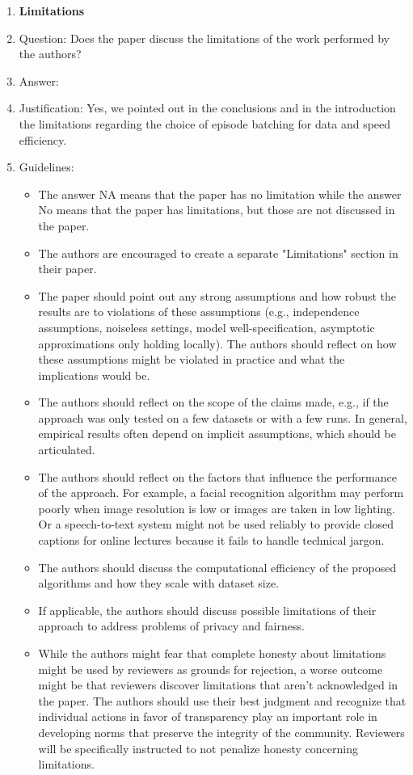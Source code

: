 \documentclass{article}
\begin{document}
\begin{enumerate}
\item {\bf Limitations}
    \item[] Question: Does the paper discuss the limitations of the work performed by the authors?
    \item[] Answer: \answerYes{} %
    \item[] Justification: Yes, we pointed out in the conclusions and in the introduction the limitations regarding the choice of episode batching for data and speed efficiency.
    \item[] Guidelines:
    \begin{itemize}
        \item The answer NA means that the paper has no limitation while the answer No means that the paper has limitations, but those are not discussed in the paper. 
        \item The authors are encouraged to create a separate "Limitations" section in their paper.
        \item The paper should point out any strong assumptions and how robust the results are to violations of these assumptions (e.g., independence assumptions, noiseless settings, model well-specification, asymptotic approximations only holding locally). The authors should reflect on how these assumptions might be violated in practice and what the implications would be.
        \item The authors should reflect on the scope of the claims made, e.g., if the approach was only tested on a few datasets or with a few runs. In general, empirical results often depend on implicit assumptions, which should be articulated.
        \item The authors should reflect on the factors that influence the performance of the approach. For example, a facial recognition algorithm may perform poorly when image resolution is low or images are taken in low lighting. Or a speech-to-text system might not be used reliably to provide closed captions for online lectures because it fails to handle technical jargon.
        \item The authors should discuss the computational efficiency of the proposed algorithms and how they scale with dataset size.
        \item If applicable, the authors should discuss possible limitations of their approach to address problems of privacy and fairness.
        \item While the authors might fear that complete honesty about limitations might be used by reviewers as grounds for rejection, a worse outcome might be that reviewers discover limitations that aren't acknowledged in the paper. The authors should use their best judgment and recognize that individual actions in favor of transparency play an important role in developing norms that preserve the integrity of the community. Reviewers will be specifically instructed to not penalize honesty concerning limitations.
    \end{itemize}


\end{enumerate}
\end{document}
